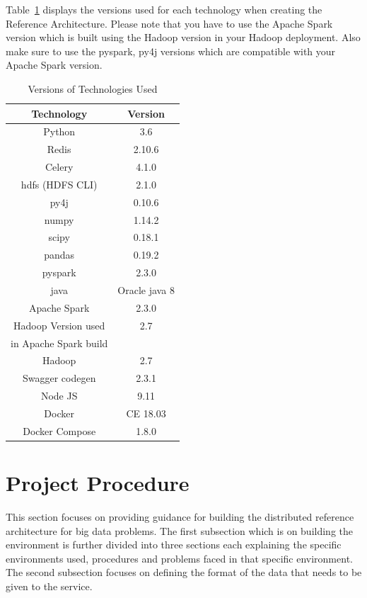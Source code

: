 Table~\ref{tbl:technologyversions} displays the versions used for each 
technology when creating the Reference Architecture. Please note that you have 
to use the Apache Spark version which is built using the Hadoop version in 
your Hadoop deployment. Also make sure to use the pyspark, py4j versions which 
are compatible with your Apache Spark version. 

\begin{table}[htbp]
	\centering
	\caption{Versions of Technologies Used}\label{tbl:technologyversions}
	\begin{tabular}{*{2}{c}}
		\toprule
		Technology & Version \\
		\midrule
		Python & 3.6   \\
		Redis & 2.10.6  \\
		Celery & 4.1.0 \\
		hdfs (HDFS CLI) & 2.1.0 \\
		py4j & 0.10.6 \\
		numpy & 1.14.2  \\
		scipy & 0.18.1  \\
		pandas & 0.19.2  \\
		pyspark & 2.3.0   \\
		java & Oracle java 8 \\
		Apache Spark & 2.3.0 \\
		Hadoop Version used & 2.7 \\
		in Apache Spark build & \\
		Hadoop & 2.7 \\
		Swagger codegen & 2.3.1   \\
		Node JS & 9.11 \\
		Docker & CE 18.03  \\
		Docker Compose & 1.8.0  \\
		\bottomrule
	\end{tabular}
\end{table}

\section{Project Procedure}

This section focuses on providing guidance for building the distributed 
reference architecture for big data problems. The first subsection which is on 
building the environment is further divided into three sections each 
explaining the specific environments used, procedures and problems faced in 
that specific environment. The second subsection focuses on defining the 
format of the data that needs to be given to the service.   

